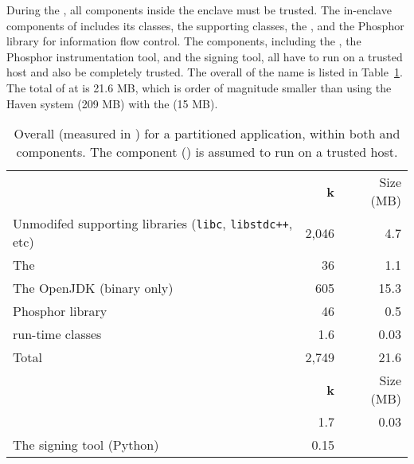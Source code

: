 During the \dynamicphase{}, all components inside the enclave must be trusted.
The in-enclave components of \sysname{} includes its \dynamicframework{} classes, the supporting classes, the \jvmname{} \jvm{}, and the Phosphor library for information flow control.
The \staticphase{} components, including the \statictool{}, the Phosphor instrumentation tool, and the \graphene{} signing tool, all have to run on a trusted host and also be completely trusted.
%
The overall \tcbsize{} of the \sysname{} name is listed in
Table~\ref{tab:common-tcb}.
The total \tcbsize{} of \sysname{} at \dynamicframework{} is 21.6 MB, which is order of magnitude smaller than using the Haven system (\roughly{}209 MB) with the \jvmname{} \jvm{} (\roughly{}15 MB).

\begin{table}[t!b!]
\caption{Overall \tcbsize{} (measured in \loc{}) for a partitioned application, within both \staticphase{} and \dynamicphase{} components.
The \staticphase{} component (\statictool{}) is assumed to run on a trusted host.}
\label{tab:common-tcb}
\small
\centering
\begin{tabular}{p{2in}rr}
\hline
\addlinespace[2pt]
{\bf \dynamicphase{} components} & {\bf k\loc{}} & Size (MB)\\
\addlinespace[2pt]
\hline
Unmodifed supporting libraries ({\tt libc}, {\tt libstdc++}, etc)
& 2,046 & 4.7 \\
The \graphene{} \libos{}
& 36 & 1.1 \\
The OpenJDK \jvm{} (binary only) 
& 605 & 15.3  \\
Phosphor library
&  46 & 0.5 \\
\sysname{} run-time classes
&   1.6 & 0.03  \\
\hline
\addlinespace[2pt]
Total & 2,749 & 21.6 \\
\addlinespace[2pt]
\hline
\hline
\addlinespace[2pt]
{\bf \staticphase{} components} & {\bf k\loc{}} & Size (MB)\\
\addlinespace[2pt]
\hline
\sysname{} \statictool{}
&   1.7 & 0.03  \\
The \graphene{} signing tool (Python)
&   0.15 &  \\
\hline
\end{tabular}
\end{table}

